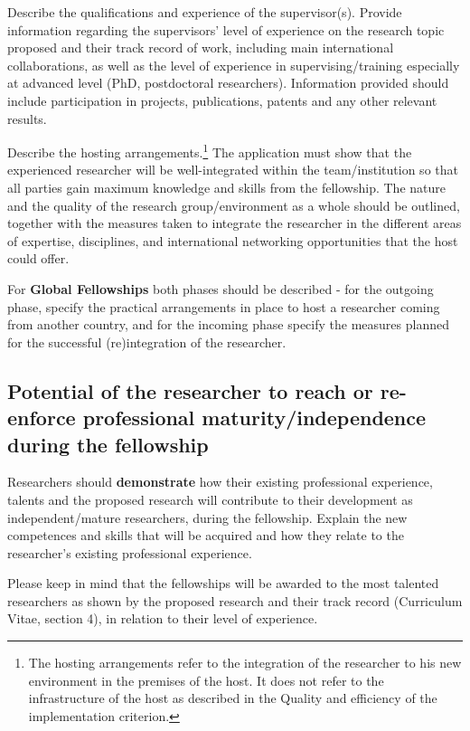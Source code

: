 Describe the qualifications and experience of the supervisor(s).
Provide information regarding the supervisors' level of experience
on the research topic proposed and their track record of work,
including main international collaborations, as well as the level
of experience in supervising/training especially at advanced level
(PhD, postdoctoral researchers). Information provided should
include participation in projects, publications, patents and any
other relevant results.

Describe the hosting arrangements.\footnote{The hosting
arrangements refer to the integration of the researcher to his new
environment in the premises of the host. It does not refer to the
infrastructure of the host as described in the Quality and
efficiency of the implementation criterion.} The application must
show that the experienced researcher will be well-integrated
within the team/institution so that all parties gain maximum
knowledge and skills from the fellowship. The nature and the
quality of the research group/environment as a whole should be
outlined, together with the measures taken to integrate the
researcher in the different areas of expertise, disciplines, and
international networking opportunities that the host could offer.

For \textbf{Global Fellowships} both phases should be described - for the outgoing phase, specify the practical arrangements in place to host a researcher coming from another country, and for the incoming phase specify the measures planned for the successful (re)integration of the researcher.


\subsection{Potential of the researcher to reach or re-enforce
professional maturity/independence during the fellowship}
\label{sec:excellence_maturity}

Researchers should \textbf{demonstrate} how their existing
professional experience, talents and the proposed research will
contribute to their development as independent/mature researchers,
during the fellowship. Explain the new competences and skills that
will be acquired and how they relate to the researcher’s existing
professional experience.

Please keep in mind that the fellowships will be awarded to the
most talented researchers as shown by the proposed research and
their track record (Curriculum Vitae, section 4), in relation to
their level of experience.

